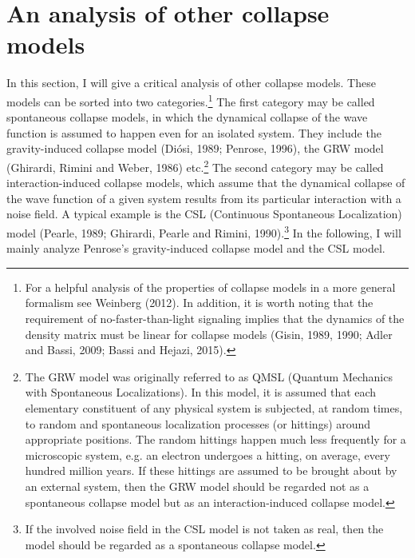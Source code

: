 \section{An analysis of other collapse models}

In this section, I will give a critical analysis of other collapse models. These models can be sorted into two categories.\footnote{For a helpful analysis of the properties of collapse models in a more general formalism see Weinberg (2012). In addition, it is worth noting that  the requirement of no-faster-than-light signaling implies that the dynamics of the density matrix must be linear for collapse models (Gisin, 1989, 1990; Adler and Bassi, 2009; Bassi and Hejazi, 2015).} The first category may be called spontaneous collapse models, in which the dynamical collapse of the wave function is assumed to happen even for an isolated system. They include the gravity-induced collapse model (Di\'{o}si, 1989; Penrose, 1996), the GRW model (Ghirardi, Rimini and Weber, 1986) etc.\footnote{The GRW model was originally referred to as QMSL (Quantum Mechanics with Spontaneous Localizations). In this model, it is assumed that each elementary constituent of any physical system is subjected, at random times, to random and spontaneous localization processes (or hittings) around appropriate positions. The random hittings happen much less frequently for a microscopic system, e.g. an electron undergoes a hitting, on average, every hundred million years. If these hittings are assumed to be brought about by an external system, then the GRW model should be regarded not as a spontaneous collapse model but as an interaction-induced collapse model.} The second category may be called interaction-induced collapse models, which assume that the dynamical collapse of the wave function of a given system results from its particular interaction with a noise field. A typical example is the CSL (Continuous Spontaneous Localization) model (Pearle, 1989; Ghirardi, Pearle and Rimini, 1990).\footnote{If the involved noise field in the CSL model is not taken as real, then the model should be regarded as a spontaneous collapse model.} In the following, I will mainly analyze Penrose's gravity-induced collapse model and the CSL model.

